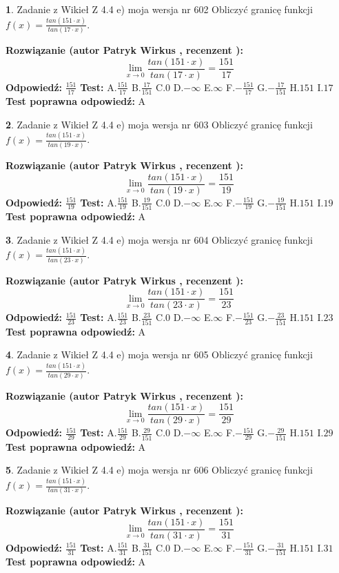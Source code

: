 \documentclass[12pt, a4paper]{article}
\theoremstyle{definition} %
\newtheorem{zad}{}
\newcommand{\zadStart}[1]{\begin{zad}#1\newline}
\newcommand{\zadStop}{\end{zad}}
\newcommand{\rozwStart}[2]{\noindent \textbf{Rozwiązanie (autor #1 , recenzent #2): }\newline}
\newcommand{\rozwStop}{\newline}
\newcommand{\odpStart}{\noindent \textbf{Odpowiedź:}\newline}
\newcommand{\odpStop}{\newline}
\newcommand{\testStart}{\noindent \textbf{Test:}\newline}
\newcommand{\testStop}{\newline}
\newcommand{\kluczStart}{\noindent \textbf{Test poprawna odpowiedź:}\newline}
\newcommand{\kluczStop}{\newline}
\begin{document}
\zadStart{Zadanie z Wikieł Z 4.4 e) moja wersja nr 602}
Obliczyć granicę funkcji $f(x)=\frac{tan(151\cdot x)}{tan(17\cdot x)}$.
\zadStop
\rozwStart{Patryk Wirkus}{}
$$\lim\limits_{x\to 0}\frac{tan(151\cdot x)}{tan(17\cdot x)}=
\frac{151}{17}$$
\rozwStop
\odpStart
$\frac{151}{17}$
\odpStop
\testStart
A.$\frac{151}{17}$
B.$\frac{17}{151}$
C.$0$
D.$-\infty$
E.$\infty$
F.$-\frac{151}{17}$
G.$-\frac{17}{151}$
H.$151$
I.$17$
\testStop
\kluczStart
A
\kluczStop



\zadStart{Zadanie z Wikieł Z 4.4 e) moja wersja nr 603}
Obliczyć granicę funkcji $f(x)=\frac{tan(151\cdot x)}{tan(19\cdot x)}$.
\zadStop
\rozwStart{Patryk Wirkus}{}
$$\lim\limits_{x\to 0}\frac{tan(151\cdot x)}{tan(19\cdot x)}=
\frac{151}{19}$$
\rozwStop
\odpStart
$\frac{151}{19}$
\odpStop
\testStart
A.$\frac{151}{19}$
B.$\frac{19}{151}$
C.$0$
D.$-\infty$
E.$\infty$
F.$-\frac{151}{19}$
G.$-\frac{19}{151}$
H.$151$
I.$19$
\testStop
\kluczStart
A
\kluczStop



\zadStart{Zadanie z Wikieł Z 4.4 e) moja wersja nr 604}
Obliczyć granicę funkcji $f(x)=\frac{tan(151\cdot x)}{tan(23\cdot x)}$.
\zadStop
\rozwStart{Patryk Wirkus}{}
$$\lim\limits_{x\to 0}\frac{tan(151\cdot x)}{tan(23\cdot x)}=
\frac{151}{23}$$
\rozwStop
\odpStart
$\frac{151}{23}$
\odpStop
\testStart
A.$\frac{151}{23}$
B.$\frac{23}{151}$
C.$0$
D.$-\infty$
E.$\infty$
F.$-\frac{151}{23}$
G.$-\frac{23}{151}$
H.$151$
I.$23$
\testStop
\kluczStart
A
\kluczStop



\zadStart{Zadanie z Wikieł Z 4.4 e) moja wersja nr 605}
Obliczyć granicę funkcji $f(x)=\frac{tan(151\cdot x)}{tan(29\cdot x)}$.
\zadStop
\rozwStart{Patryk Wirkus}{}
$$\lim\limits_{x\to 0}\frac{tan(151\cdot x)}{tan(29\cdot x)}=
\frac{151}{29}$$
\rozwStop
\odpStart
$\frac{151}{29}$
\odpStop
\testStart
A.$\frac{151}{29}$
B.$\frac{29}{151}$
C.$0$
D.$-\infty$
E.$\infty$
F.$-\frac{151}{29}$
G.$-\frac{29}{151}$
H.$151$
I.$29$
\testStop
\kluczStart
A
\kluczStop



\zadStart{Zadanie z Wikieł Z 4.4 e) moja wersja nr 606}
Obliczyć granicę funkcji $f(x)=\frac{tan(151\cdot x)}{tan(31\cdot x)}$.
\zadStop
\rozwStart{Patryk Wirkus}{}
$$\lim\limits_{x\to 0}\frac{tan(151\cdot x)}{tan(31\cdot x)}=
\frac{151}{31}$$
\rozwStop
\odpStart
$\frac{151}{31}$
\odpStop
\testStart
A.$\frac{151}{31}$
B.$\frac{31}{151}$
C.$0$
D.$-\infty$
E.$\infty$
F.$-\frac{151}{31}$
G.$-\frac{31}{151}$
H.$151$
I.$31$
\testStop
\kluczStart
A
\kluczStop
\end{document}
